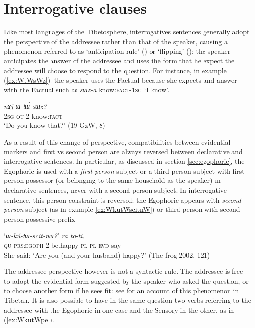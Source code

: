\documentclass[oldfontcommands,oneside,a4paper,11pt]{article}
\newcommand{\ipa}[1]{{\phon\textit{#1}}} %
\newcommand{\refb}[1]{(\ref{#1})}
\begin{document}
\section{Interrogative clauses}
Like most languages of the Tibetosphere, interrogatives sentences generally adopt the perspective of the addressee rather than that of the speaker, causing a phenomenon referred to as `anticipation rule' (\citealt[244]{tournadre14evidentiality}) or `flipping' (\citealt{sanroque15interrogativity}):   the speaker anticipates the answer of the addressee and uses the form that he expect the addressee will choose to respond to the question. For instance, in example \refb{ex:WtWsWz}, the speaker uses the Factual because she expects and answer with the Factual such as \ipa{sɯz-a} know:\textsc{fact}-\textsc{1sg} `I know'.

\begin{exe}
\ex \label{ex:WtWsWz}
\gll 
\ipa{nɤj}	\ipa{ɯ-tɯ́-sɯz?} \\
\textsc{2sg} \textsc{qu}-2-know:\textsc{fact} \\
\glt `Do you know that?' (19 GzW, 8)
\end{exe}

As a result of this change of perspective, compatibilities between evidential markers and first vs second person are always reversed between declarative and interrogative sentences. In particular, as discussed in section \ref{sec:egophoric}, the Egophoric is used with a \textit{first person} subject or a third person subject with first person possessor (or belonging to the same household as the speaker) in declarative sentences, never with a second person subject. In interrogative sentence, this person constraint is reversed: the Egophoric appears with \textit{second person} subject (as in example \ref{ex:WkutWscitnW}) or third person with second person possessive prefix. 


\begin{exe}
\ex \label{ex:WkutWscitnW}
\gll	`\ipa{ɯ-kú-tɯ-scit-nɯ?}' 	\ipa{ra} 	\ipa{to-ti,} \\
  \textsc{qu-prs:egoph}-2-be.happy-\textsc{pl} \textsc{pl} \textsc{evd}-say \\
\glt She said: `Are you (and your husband) happy?' (The frog 2002, 121)
\end{exe}



The addressee perspective however is not a syntactic rule. The addressee is free to adopt the evidential form suggested by the speaker who asked the question, or to choose another form if he sees fit: see \citealt{garrett07symbiosis} for an account of this phenomenon in Tibetan. It is also possible to have in the same question two verbs referring to the addressee with the Egophoric in one case and the Sensory in the other, as in \refb{ex:WkutWpe}. 
\end{document}
